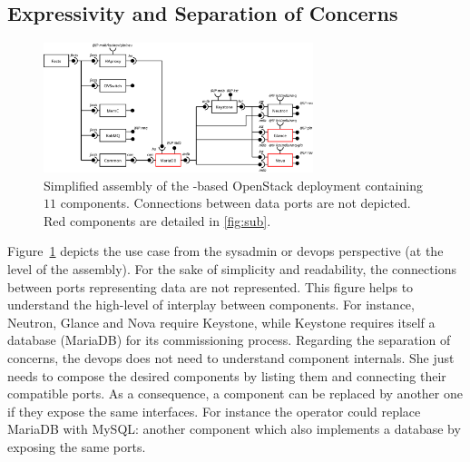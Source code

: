 \subsection{Expressivity and Separation of Concerns}

\begin{figure}
  \begin{center}
    \includegraphics[width=0.7\textwidth]{./images/full2.pdf}
    \caption{Simplified \mad assembly of the \kolla-based OpenStack deployment
    containing $11$ components. Connections between data ports are not depicted.
    Red components are detailed in \cref{fig:sub}.}
    \label{fig:full}
  \end{center}
\end{figure}

Figure~\ref{fig:full} depicts the use case from the sysadmin or devops perspective 
(\ie at the level of the \mad assembly). For the sake of simplicity and 
readability, the connections between ports representing data are not represented. 
This figure helps to understand the high-level of interplay between components. 
For instance, Neutron, Glance and Nova require Keystone, while Keystone requires 
itself a database (\ie MariaDB) for its commissioning process. Regarding the 
separation of concerns, the devops does not need to understand component 
internals. She just needs to compose the desired components by listing them and 
connecting their compatible ports. As a consequence, a component can be replaced 
by another one if they expose the same interfaces. For instance the operator could 
replace MariaDB with MySQL: another component which also implements a database by 
exposing the same ports.

